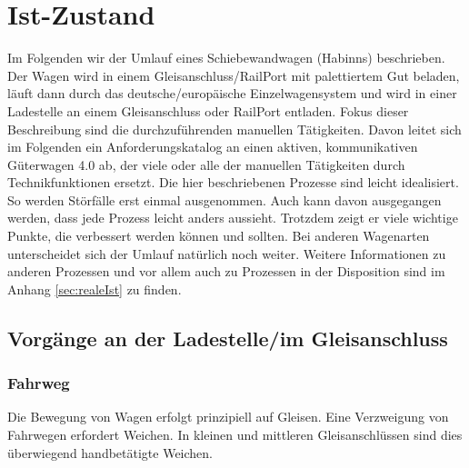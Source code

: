 \section{Ist-Zustand}\label{sec:Istzustand} %
Im Folgenden wir der Umlauf eines \gls{Schiebewandwagen} (Habinns) beschrieben. Der Wagen wird in einem \gls{Gleisanschluss}/RailPort mit palettiertem Gut beladen, läuft dann durch das deutsche/europäische Einzelwagensystem und wird in einer Ladestelle an einem Gleisanschluss oder RailPort entladen. Fokus dieser Beschreibung sind die durchzuführenden manuellen Tätigkeiten. Davon leitet sich im Folgenden ein Anforderungskatalog an einen aktiven, kommunikativen Güterwagen 4.0 ab, der viele oder alle der manuellen Tätigkeiten durch Technikfunktionen ersetzt.
Die hier beschriebenen Prozesse sind leicht idealisiert. So werden Störfälle erst einmal ausgenommen. Auch kann davon ausgegangen werden, dass jede Prozess leicht anders aussieht. Trotzdem zeigt er viele wichtige Punkte, die verbessert werden können und sollten. Bei anderen Wagenarten unterscheidet sich der Umlauf natürlich noch weiter. Weitere Informationen zu anderen Prozessen und vor allem auch zu Prozessen in der Disposition sind im Anhang \ref{sec:realeIst} zu finden. \par
\subsection{Vorgänge an der Ladestelle/im Gleisanschluss}\label{sec:Ladestelle}
\subsubsection{Fahrweg} \label{sec:Fahrweg}
Die Bewegung von Wagen erfolgt prinzipiell auf Gleisen. Eine Verzweigung von Fahrwegen erfordert Weichen. In kleinen und mittleren Gleisanschlüssen sind dies überwiegend handbetätigte Weichen. 
